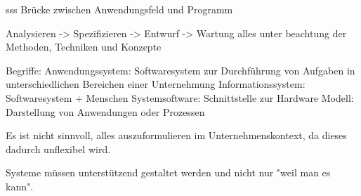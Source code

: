 \documentclass[12pt]{article}
\begin{document}
sss
Brücke zwischen Anwendungsfeld und Programm

Analysieren -> Spezifizieren -> Entwurf -> Wartung
alles unter beachtung der Methoden, Techniken und Konzepte

Begriffe:
Anwendungssystem: Softwaresystem zur Durchführung von Aufgaben in
unterschiedlichen Bereichen einer Unternehmung
Informationssystem: Softwaresystem + Menschen
Systemsoftware: Schnittstelle zur Hardware
Modell: Darstellung von Anwendungen oder Prozessen

Es ist nicht sinnvoll, alles auszuformulieren im Unternehmenskontext, da dieses dadurch unflexibel wird.

Systeme müssen unterstützend gestaltet werden und nicht nur "weil man es kann".
\end{document}

